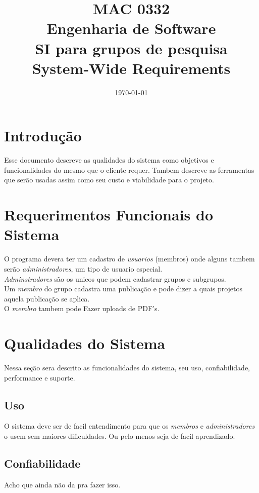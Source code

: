 \documentclass[11pt, a4paper]{article}
\title{MAC 0332\\
	Engenharia de Software\\
	SI para grupos de pesquisa\\
	System-Wide Requirements}
\date{\today}
\begin{document}
	\maketitle
	\newpage
	
	\section{Introdução}
		Esse documento descreve as qualidades do sistema como objetivos e 
		funcionalidades do mesmo que o cliente requer. Tambem descreve as 
		ferramentas que serão usadas assim como seu custo e viabilidade para 
		o projeto. 
	\section{Requerimentos Funcionais do Sistema}
		O programa devera ter um cadastro de \textit{usuarios} (membros) onde 
		\indent alguns tambem serão \textit{administradores}, um tipo de usuario 
		especial.\\
		\indent \textit{Adminstradores} são os unicos que podem cadastrar 
		grupos e subgrupos.\\
		\indent Um \textit{membro} do grupo cadastra uma publicação e pode 
		dizer a quais projetos aquela publicação se aplica.\\
		\indent O \textit{membro} tambem pode Fazer uploads de PDF's.
		
	\section{Qualidades do Sistema}
		Nessa seção sera descrito as funcionalidades do sistema, seu uso, 
		confiabilidade, performance e suporte.
		
		\subsection{Uso}
			O sistema deve ser de facil entendimento para que os 
			\textit{membros} e \textit{administradores} o usem sem maiores 
			dificuldades. Ou pelo menos seja de facil aprendizado.
		
		\subsection{Confiabilidade}
			Acho que ainda não da pra fazer isso.
		
\end{document}
